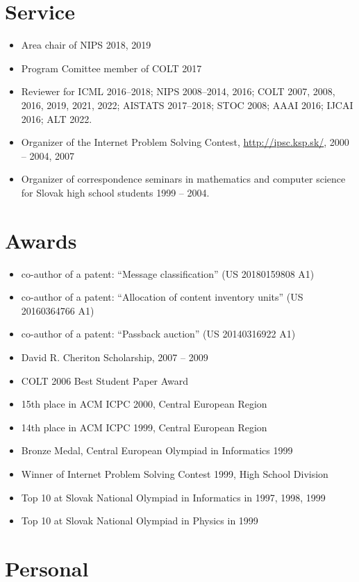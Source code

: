 \documentclass[9pt]{article}
\begin{document}
\section*{Service}

\begin{itemize}
\item Area chair of NIPS 2018, 2019
\item Program Comittee member of COLT 2017
\item Reviewer for ICML 2016--2018; NIPS 2008--2014, 2016; COLT 2007, 2008, 2016, 2019, 2021, 2022; AISTATS 2017--2018; STOC 2008; AAAI 2016; IJCAI 2016; ALT 2022.
\item Organizer of the Internet Problem Solving Contest, \url{http://ipsc.ksp.sk/}, 2000 -- 2004, 2007
\item Organizer of correspondence seminars in mathematics and computer science for Slovak high school students 1999 -- 2004.
\end{itemize}

\section*{Awards}

\begin{itemize}
\item co-author of a patent: ``Message classification'' (US 20180159808 A1)
\item co-author of a patent: ``Allocation of content inventory units'' (US 20160364766 A1)
\item co-author of a patent: ``Passback auction'' (US 20140316922 A1)
\item David R. Cheriton Scholarship, 2007 -- 2009
\item COLT 2006 Best Student Paper Award
\item 15th place in ACM ICPC 2000, Central European Region
\item 14th place in ACM ICPC 1999, Central European Region
\item Bronze Medal, Central European Olympiad in Informatics 1999
\item Winner of Internet Problem Solving Contest 1999, High School Division
\item Top 10 at Slovak National Olympiad in Informatics in 1997, 1998, 1999
\item Top 10 at Slovak National Olympiad in Physics in 1999
\end{itemize}

\section*{Personal}
\end{document}

